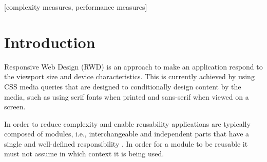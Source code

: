 \documentclass{acm_proc_article-sp}
\begin{document}
\date{10 October 2015}

\maketitle
\begin{abstract}

\end{abstract}

[complexity measures, performance measures]



\section{Introduction}

  Responsive Web Design (RWD) is an approach to make an application respond to the viewport size and device characteristics.
  This is currently achieved by using CSS media queries that are designed to conditionally design content by the media, such as using serif fonts when printed and sans-serif when viewed on a screen.

  In order to reduce complexity and enable reusability applications are typically composed of modules, i.e., interchangeable and independent parts that have a single and well-defined responsibility \cite{parnas1972criteria}.
  In order for a module to be reusable it must not assume in which context it is being used.
\end{document}
